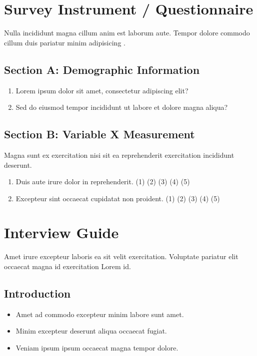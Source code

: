 \begin{theappendices}

  \chapter{Survey Instrument / Questionnaire}
  \label{app:survey}

  Nulla incididunt magna cillum anim est laborum aute. Tempor dolore commodo cillum duis pariatur minim adipisicing \parencite{placeholderBook2023}.

  \section{Section A: Demographic Information}
  \begin{enumerate}
    \item Lorem ipsum dolor sit amet, consectetur adipiscing elit?
    \item Sed do eiusmod tempor incididunt ut labore et dolore magna aliqua?
  \end{enumerate}

  \section{Section B: Variable X Measurement}
  Magna sunt ex exercitation nisi sit ea reprehenderit exercitation incididunt deserunt.
  \begin{enumerate}
    \item Duis aute irure dolor in reprehenderit. \quad (1) (2) (3) (4) (5)
    \item Excepteur sint occaecat cupidatat non proident. \quad (1) (2) (3) (4) (5)
  \end{enumerate}

  \chapter{Interview Guide}
  \label{app:interview_guide}

  Amet irure excepteur laboris ea sit velit exercitation. Voluptate pariatur elit occaecat magna id exercitation Lorem id.

  \section{Introduction}
  \begin{itemize}
    \item Amet ad commodo excepteur minim labore sunt amet.
    \item Minim excepteur deserunt aliqua occaecat fugiat.
    \item Veniam ipsum ipsum occaecat magna tempor dolore.
  \end{itemize}


\end{theappendices}
